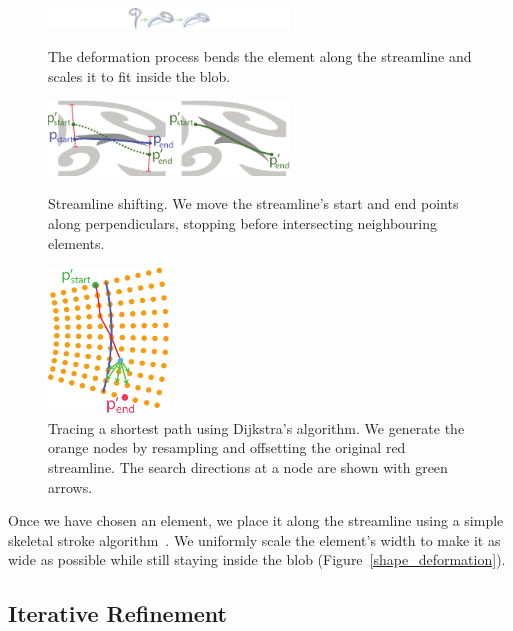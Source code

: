 \begin{figure}
\centering
\includegraphics[width=6.4cm]{figures/flowpak/shape_deformation.pdf}
\caption{\label{shape_deformation}
The deformation process bends the element along the streamline and
scales it to fit inside the blob.}
\bigskip
 \includegraphics[width=6.4cm]{figures/flowpak/shift_streamline.pdf}
 \caption{\label{shift_streamline}
 Streamline shifting.
 	We move the streamline's start and end points along 
	perpendiculars, stopping before intersecting neighbouring elements.}
\smallskip
\includegraphics[width=3.2cm]{figures/flowpak/dijkstra.pdf}
 \caption{\label{dijkstra}
 Tracing a shortest path using Dijkstra's algorithm.  We generate the 
 orange nodes by resampling and offsetting the original red streamline.
          The search directions at a node are shown with green arrows.}
\end{figure}

Once we have chosen an element, we place it along the streamline using a
simple skeletal stroke algorithm~\cite{Hsu93}. We uniformly scale the element's width
to make it as wide as possible while still staying inside the blob
(Figure~\ref{shape_deformation}).

\subsection{Iterative Refinement}

